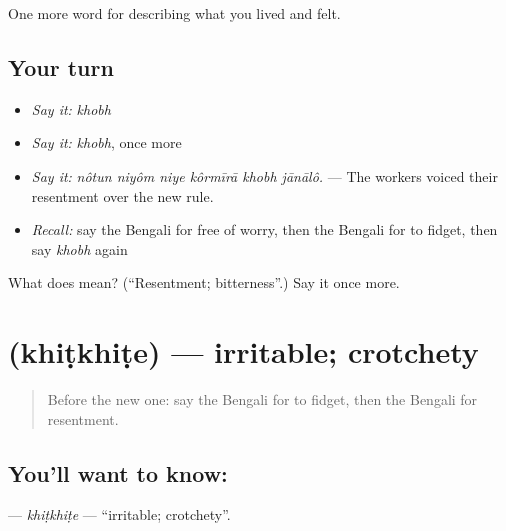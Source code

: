 \begin{grammarlens}[title={What you've built}]
One more word for describing what you lived and felt.
\end{grammarlens}

\subsection*{Your turn}
\begin{itemize}
\raggedright
  \item \emph{Say it:} \emph{khobh}
  \item \emph{Say it:} \emph{khobh}, once more
  \item \emph{Say it:} \emph{nôtun niyôm niye kôrmīrā khobh jānālô.} — The workers voiced their resentment over the new rule.
  \item \emph{Recall:} say the Bengali for free of worry, then the Bengali for to fidget, then say \emph{khobh} again
\end{itemize}

\begin{tcolorbox}[breakable,colback=teal!4,colframe=teal!35!black,title={Before you move on}]
What does  mean? (\textquotedblleft{}Resentment; bitterness\textquotedblright{}.) Say it once more.
\end{tcolorbox}
\section[\texorpdfstring{\bn{খিটখিটে} (khiṭkhiṭe)}{খিটখিটে (khiṭkhiṭe)}]{ (khiṭkhiṭe) — irritable; crotchety}

\label{lesson:BN-C443-khitkhite}



\begin{quote}
Before the new one: say the Bengali for to fidget, then the Bengali for resentment.
\end{quote}

\subsection*{You'll want to know: }
\textbf{} — \emph{khiṭkhiṭe} — \textquotedblleft{}irritable; crotchety\textquotedblright{}.

\begin{quote}
     
\end{quote}

